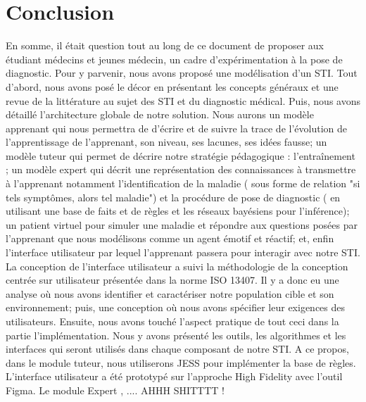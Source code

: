 
\chapter{Conclusion}
\label{chp:conclusion}

En somme, il était question tout au long de ce document de proposer aux étudiant médecins et jeunes médecin, un cadre d'expérimentation à la pose de diagnostic. Pour y parvenir, nous avons proposé une modélisation d'un STI. Tout d'abord, nous avons posé le décor en présentant les concepts généraux et une revue de la littérature au sujet des STI et du diagnostic médical. Puis, nous avons détaillé l'architecture globale de notre solution. Nous aurons un modèle apprenant qui nous permettra de d'écrire et de suivre la trace de l’évolution de l’apprentissage de l’apprenant, son niveau, ses lacunes, ses idées fausse; un modèle tuteur qui permet de décrire notre stratégie pédagogique : l'entraînement ; un modèle expert qui décrit une représentation des connaissances à transmettre à l'apprenant notamment l'identification de la maladie ( sous forme de relation "si tels symptômes, alors tel maladie") et la procédure de pose de diagnostic ( en utilisant une base de faits et de règles et les réseaux bayésiens pour l'inférence); un patient virtuel pour simuler une maladie et répondre aux questions posées par l'apprenant que nous modélisons comme un agent émotif et réactif; et, enfin l'interface utilisateur par lequel l'apprenant passera pour interagir avec notre STI. La conception de l'interface utilisateur a suivi la méthodologie de la conception centrée sur utilisateur présentée dans la norme ISO 13407. Il y a donc eu une analyse où nous avons identifier et caractériser notre population cible et son environnement; puis, une conception où nous avons spécifier leur exigences des utilisateurs. Ensuite, nous avons touché l'aspect pratique de tout ceci dans la partie l'implémentation. Nous y avons présenté les outils, les algorithmes et les interfaces qui seront utilisés dans chaque composant de notre STI. A ce propos, dans le module tuteur, nous utiliserons JESS pour implémenter la base de règles. L'interface utilisateur a été prototypé sur l'approche High Fidelity avec l'outil Figma. Le module Expert , .... AHHH SHITTTT !
